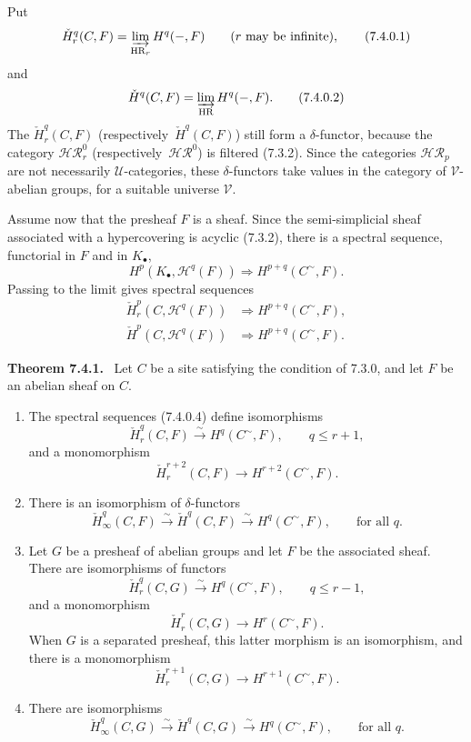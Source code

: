 \documentclass[11pt]{article}
\newcommand{\U}{\mathcal{U}}
\newcommand{\V}{\mathcal{V}}
\newcommand{\Hh}{\mathcal{H}}
\newcommand{\HR}{\operatorname{HR}}
\newcommand{\resp}{respectively}
\newcommand{\sheaf}[1]{\mathcal{#1}}
\newcommand{\clH}[2]{\check H_{#1}^{#2}}
\newcommand{\clHi}[1]{\check H_{\infty}^{#1}}
\newcommand{\clHall}[1]{\check H^{#1}}
\newenvironment{statement}[1]{\par\medskip\noindent\textbf{#1.}\ }{\par\medskip}
\begin{document}
Put
\begin{equation*}
        \clH{r}{q}(C,F)=\varinjlim_{\HR_r}H^q(-,F)
        \qquad (r\text{ may be infinite}),\tag{7.4.0.1}
\end{equation*}
and
\begin{equation*}
        \clHall{q}(C,F)=\varinjlim_{\HR}H^q(-,F).\tag{7.4.0.2}
\end{equation*}
The $\clH{r}{q}(C,F)$ (\resp\ $\clHall{q}(C,F)$) still form a $\delta$-functor, because the category $\sheaf{HR}_r^0$ (\resp\ $\sheaf{HR}^0$) is filtered (7.3.2). Since the categories $\sheaf{HR}_p$ are not necessarily $\U$-categories, these $\delta$-functors take values in the category of $\V$-abelian groups, for a suitable universe $\V$.

Assume now that the presheaf $F$ is a sheaf. Since the semi-simplicial sheaf associated with a hypercovering is acyclic (7.3.2), there is a spectral sequence, functorial in $F$ and in $K_\bullet$,
\begin{equation*}
        H^p(K_\bullet,\Hh^q(F))\Longrightarrow H^{p+q}(C^{\sim},F).\tag{7.4.0.3}
\end{equation*}
Passing to the limit gives spectral sequences
\begin{equation*}
\begin{split}
        \clH{r}{p}(C,\Hh^q(F))&\Longrightarrow H^{p+q}(C^{\sim},F),\\
        \clHall{p}(C,\Hh^q(F))&\Longrightarrow H^{p+q}(C^{\sim},F).
\end{split}\tag{7.4.0.4}
\end{equation*}

\begin{statement}{Theorem 7.4.1}
Let $C$ be a site satisfying the condition of 7.3.0, and let $F$ be an abelian sheaf on $C$.
\begin{enumerate}[label=\arabic*)]
\item The spectral sequences (7.4.0.4) define isomorphisms
\[
        \clH{r}{q}(C,F)\xrightarrow{\sim}H^q(C^{\sim},F),\qquad q\leq r+1,
\]
and a monomorphism
\[
        \clH{r}{r+2}(C,F)\longrightarrow H^{r+2}(C^{\sim},F).
\]
\item There is an isomorphism of $\delta$-functors
\[
        \clHi{q}(C,F)\xrightarrow{\sim}\clHall{q}(C,F)\xrightarrow{\sim}H^q(C^{\sim},F),\qquad \text{for all }q.
\]
\item Let $G$ be a presheaf of abelian groups and let $F$ be the associated sheaf. There are isomorphisms of functors
\[
        \clH{r}{q}(C,G)\xrightarrow{\sim}H^q(C^{\sim},F),\qquad q\leq r-1,
\]
and a monomorphism
\[
        \clH{r}{r}(C,G)\longrightarrow H^r(C^{\sim},F).
\]
When $G$ is a separated presheaf, this latter morphism is an isomorphism, and there is a monomorphism
\[
        \clH{r}{r+1}(C,G)\longrightarrow H^{r+1}(C^{\sim},F).
\]
\item There are isomorphisms
\[
        \clHi{q}(C,G)\xrightarrow{\sim}\clHall{q}(C,G)\xrightarrow{\sim}H^q(C^{\sim},F),\qquad \text{for all }q.
\]
\end{enumerate}
\end{statement}
\end{document}
